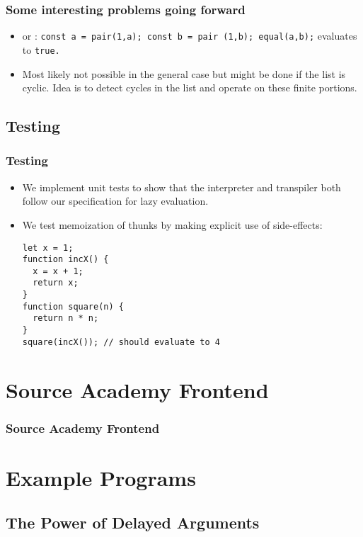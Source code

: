 \documentclass[12pt]{beamer}
\begin{document}
\begin{frame}
\frametitle{Some interesting problems going forward}
\begin{itemize}
    \item<1-> or : \break
    \texttt{const a = pair(1,a); \break const b = pair (1,b); \break equal(a,b);} evaluates to \texttt{true.}
    \item<2-> Most likely not possible in the general case but might be done if the list is cyclic. Idea is to detect cycles in the list and operate on these finite portions. 
\end{itemize}
\end{frame}




\subsection{Testing}

\begin{frame}[fragile]
\frametitle{Testing}
\begin{itemize}
\item<1-> We implement unit tests to show that the interpreter and transpiler both follow our specification for lazy evaluation.
\item<2-> We test memoization of thunks by making explicit use of side-effects:
\begin{lstlisting}
let x = 1;
function incX() {
  x = x + 1;
  return x;
}
function square(n) {
  return n * n;
}
square(incX()); // should evaluate to 4
\end{lstlisting}
\end{itemize}
\end{frame}

\section{Source Academy Frontend}

\begin{frame}
\frametitle{Source Academy Frontend}
\end{frame}

\section{Example Programs}

\subsection{The Power of Delayed Arguments}
\end{document}
